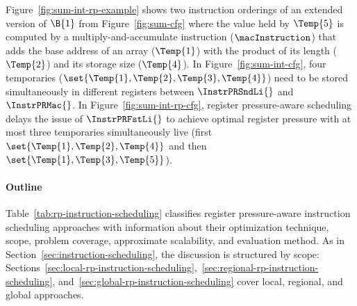 \documentclass[acmsmall,authorversion,nonacm]{acmart}
\begin{document}
Figure~\ref{fig:sum-int-rp-example} shows two instruction orderings of
an extended version of $\B{1}$ from Figure~\ref{fig:sum-cfg} where the
value held by $\Temp{5}$ is computed by a multiply-and-accumulate
instruction ($\macInstruction$) that adds the base address of an array
($\Temp{1}$) with the product of its length ($\Temp{2}$) and its
storage size ($\Temp{4}$).
In Figure~\ref{fig:sum-int-cfg}, four temporaries ($\set{\Temp{1},
  \Temp{2}, \Temp{3}, \Temp{4}}$) need to be stored simultaneously in
different registers between $\InstrPRSndLi{}$ and $\InstrPRMac{}$.
In Figure~\ref{fig:sum-int-rp-cfg}, register pressure-aware scheduling
delays the issue of $\InstrPRFstLi{}$ to achieve optimal register
pressure with at most three temporaries simultaneously live (first
$\set{\Temp{1}, \Temp{2}, \Temp{4}}$ and then $\set{\Temp{1},
  \Temp{3}, \Temp{5}}$).

\paragraph{Outline}

Table~\ref{tab:rp-instruction-scheduling} classifies register
pressure-aware instruction scheduling approaches with information
about their optimization technique, scope, problem coverage,
approximate scalability, and evaluation method.
As in Section~\ref{sec:instruction-scheduling}, the discussion is
structured by scope:
Sections~\ref{sec:local-rp-instruction-scheduling},~\ref{sec:regional-rp-instruction-scheduling},
and~\ref{sec:global-rp-instruction-scheduling} cover local, regional,
and global approaches.
\end{document}
